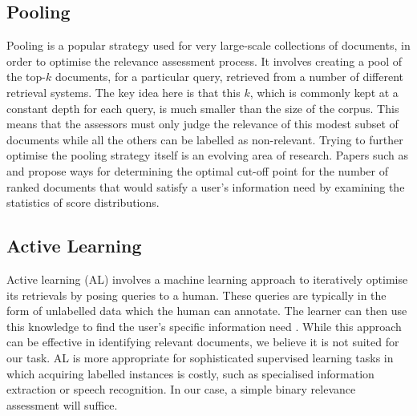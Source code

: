 \documentclass{l4proj}
\begin{document}
\subsection{Pooling}
\label{sec:background_pooling}
Pooling is a popular strategy used for very large-scale collections of documents, in order to optimise the relevance assessment process. It involves creating a pool of the top-$k$ documents, for a particular query, retrieved from a number of different retrieval systems. The key idea here is that this $k$, which is commonly kept at a constant depth for each query, is much smaller than the size of the corpus. This means that the assessors must only judge the relevance of this modest subset of documents while all the others can be labelled as non-relevant. Trying to further optimise the pooling strategy itself is an evolving area of research. Papers such as \citep{arampatzis2009stop} and \citep{lien2019assumption} propose ways for determining the optimal cut-off point for the number of ranked documents that would satisfy a user's information need by examining the statistics of score distributions.


\subsection{Active Learning}
Active learning (AL) involves a machine learning approach to iteratively optimise its retrievals by posing queries to a human. These queries are typically in the form of unlabelled data which the human can annotate. The learner can then use this knowledge to find the user's specific information need \citep{burr2012al}. While this approach can be effective in identifying relevant documents, we believe it is not suited for our task. AL is more appropriate for sophisticated supervised learning tasks in which acquiring labelled instances is costly, such as specialised information extraction or speech recognition. In our case, a simple binary relevance assessment will suffice.
\end{document}
